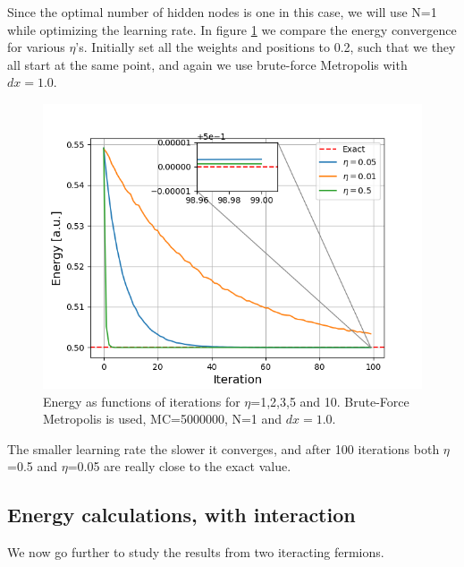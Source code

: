 \documentclass[norsk,a4paper,12pt]{article}
\begin{document}
Since the optimal number of hidden nodes is one in this case, we will use N=1 while optimizing the learning rate. In figure \ref{fig:compare_etas} we compare the energy convergence for various $\eta$'s.  Initially set all the weights and positions to 0.2, such that we they all start at the same point, and again we use brute-force Metropolis with $dx=1.0$.

 \begin{figure} [H]
 	\centering
 	\includegraphics[scale=0.8]{plots/energy_compare_eta.png}
 	\caption{Energy as functions of iterations for $\eta$=1,2,3,5 and 10. Brute-Force Metropolis is used, MC=5000000, N=1 and $dx=1.0$.}
 	\label{fig:compare_etas}
 \end{figure}
The smaller learning rate the slower it converges, and after 100 iterations both $\eta$=0.5 and $\eta$=0.05 are really close to the exact value. 

\subsection{Energy calculations, with interaction}
We now go further to study the results from two iteracting fermions. 
\end{document}
